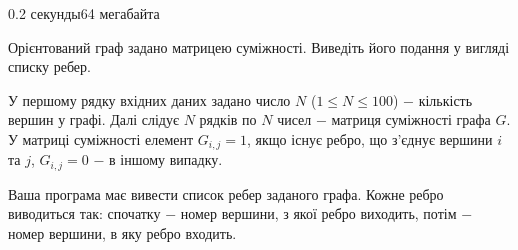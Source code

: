 \begin{problem}{}{}{}{0.2 секунды}{64 мегабайта}

Орієнтований граф задано матрицею суміжності. Виведіть його подання у вигляді списку ребер.

\InputFile
У першому рядку вхідних даних задано число $N$ ($1 \le N \le 100$) $-$ кількість вершин у графі.
Далі слідує $N$ рядків по $N$ чисел $-$ матриця суміжності графа $G$. У матриці суміжності елемент $G_{i,j}=1$, якщо
існує ребро, що з'єднує вершини $i$ та $j$, $G_{i,j}=0$ $-$ в іншому випадку.

\OutputFile
Ваша програма має вивести список ребер заданого графа. Кожне ребро виводиться так: спочатку $-$
номер вершини, з якої ребро виходить, потім $-$ номер вершини, в яку ребро входить.

\Example

\begin{example}
%
\end{example}

\end{problem}

